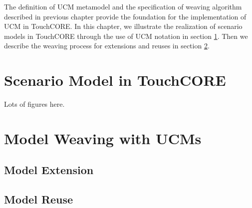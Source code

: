 The definition of UCM metamodel and the specification of weaving algorithm described in previous chapter provide the foundation for the implementation of UCM in TouchCORE. In this chapter, we illustrate the realization of scenario models in TouchCORE through the use of UCM notation in section \ref{sec:4.1}. Then we describe the weaving process for extensions and reuses in section \ref{sec:4.2}.

\section{Scenario Model in TouchCORE} \label{sec:4.1}

Lots of figures here.

\section{Model Weaving with UCMs} \label{sec:4.2}


\subsection{Model Extension}

\subsection{Model Reuse}
